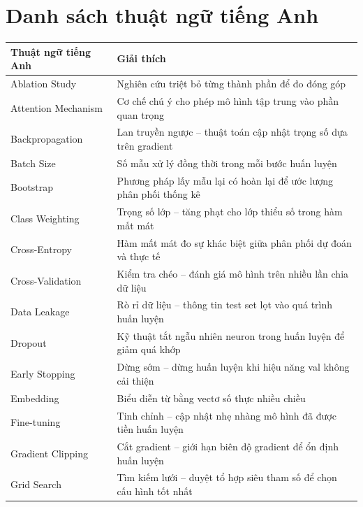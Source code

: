 \documentclass[12pt, a4paper]{report}
\begin{document}
\chapter*{Danh sách thuật ngữ tiếng Anh}
\label{glossary}

\vspace{0.5em}
\noindent\begin{longtable}{p{5cm} p{9cm}}
\toprule
\textbf{Thuật ngữ tiếng Anh} & \textbf{Giải thích} \\
\midrule
Ablation Study      & Nghiên cứu triệt bỏ từng thành phần để đo đóng góp \\[0.3em]
Attention Mechanism & Cơ chế chú ý cho phép mô hình tập trung vào phần quan trọng \\[0.3em]
Backpropagation     & Lan truyền ngược -- thuật toán cập nhật trọng số dựa trên gradient \\[0.3em]
Batch Size          & Số mẫu xử lý đồng thời trong mỗi bước huấn luyện \\[0.3em]
Bootstrap           & Phương pháp lấy mẫu lại có hoàn lại để ước lượng phân phối thống kê \\[0.3em]
Class Weighting     & Trọng số lớp -- tăng phạt cho lớp thiểu số trong hàm mất mát \\[0.3em]
Cross-Entropy       & Hàm mất mát đo sự khác biệt giữa phân phối dự đoán và thực tế \\[0.3em]
Cross-Validation    & Kiểm tra chéo -- đánh giá mô hình trên nhiều lần chia dữ liệu \\[0.3em]
Data Leakage        & Rò rỉ dữ liệu -- thông tin test set lọt vào quá trình huấn luyện \\[0.3em]
Dropout             & Kỹ thuật tắt ngẫu nhiên neuron trong huấn luyện để giảm quá khớp \\[0.3em]
Early Stopping      & Dừng sớm -- dừng huấn luyện khi hiệu năng val không cải thiện \\[0.3em]
Embedding           & Biểu diễn từ bằng vectơ số thực nhiều chiều \\[0.3em]
Fine-tuning         & Tinh chỉnh -- cập nhật nhẹ nhàng mô hình đã được tiền huấn luyện \\[0.3em]
Gradient Clipping   & Cắt gradient -- giới hạn biên độ gradient để ổn định huấn luyện \\[0.3em]
Grid Search         & Tìm kiếm lưới -- duyệt tổ hợp siêu tham số để chọn cấu hình tốt nhất \\[0.3em]

\end{longtable}
\end{document}
